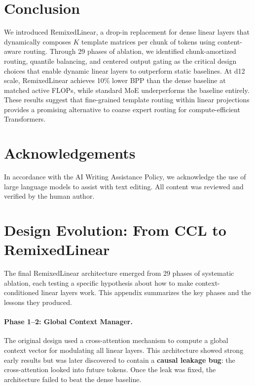 \documentclass[11pt]{article}
\begin{document}
\section{Conclusion}

We introduced RemixedLinear, a drop-in replacement for dense linear layers that dynamically composes $K$ template matrices per chunk of tokens using content-aware routing. Through 29 phases of ablation, we identified chunk-amortized routing, quantile balancing, and centered output gating as the critical design choices that enable dynamic linear layers to outperform static baselines. At d12 scale, RemixedLinear achieves 10\% lower BPP than the dense baseline at matched active FLOPs, while standard MoE underperforms the baseline entirely. These results suggest that fine-grained template routing within linear projections provides a promising alternative to coarse expert routing for compute-efficient Transformers.

\section*{Acknowledgements}
In accordance with the AI Writing Assistance Policy, we acknowledge the use of large language models to assist with text editing. All content was reviewed and verified by the human author.



\clearpage
\appendix
\section{Design Evolution: From CCL to RemixedLinear}
\label{app:evolution}

The final RemixedLinear architecture emerged from 29 phases of systematic ablation, each testing a specific hypothesis about how to make context-conditioned linear layers work. This appendix summarizes the key phases and the lessons they produced.

\paragraph{Phase 1--2: Global Context Manager.}
The original design used a cross-attention mechanism to compute a global context vector for modulating all linear layers. This architecture showed strong early results but was later discovered to contain a \textbf{causal leakage bug}: the cross-attention looked into future tokens. Once the leak was fixed, the architecture failed to beat the dense baseline.
\end{document}
